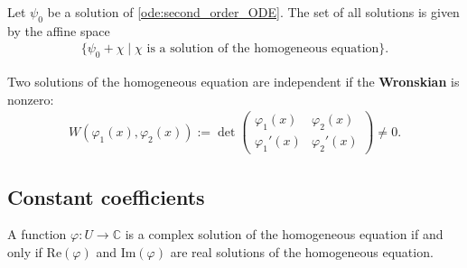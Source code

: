     \begin{property}
        Let $\psi_0$ be a solution of \ref{ode:second_order_ODE}. The set of all solutions is given by the affine space
        \begin{gather}
            \big\{\psi_0 + \chi\mid\chi\text{ is a solution of the homogeneous equation}\big\}.
        \end{gather}
    \end{property}
    \begin{property}
        Two solutions of the homogeneous equation are independent if the \textbf{Wronskian} is nonzero:
        \begin{gather}
            \label{ode:wronskian}
            W\left(\varphi_1(x),\varphi_2(x)\right) := \det
            \begin{pmatrix}
                \varphi_1(x)&\varphi_2(x)\\
                \varphi_1'(x)&\varphi_2'(x)
            \end{pmatrix}
            \neq 0.
        \end{gather}
    \end{property}


\subsection{Constant coefficients}

    \begin{property}
        A function $\varphi:U\rightarrow\mathbb{C}$ is a complex solution of the homogeneous equation if and only if $\mathrm{Re}(\varphi)$ and $\mathrm{Im}(\varphi)$ are real solutions of the homogeneous equation.
    \end{property}

